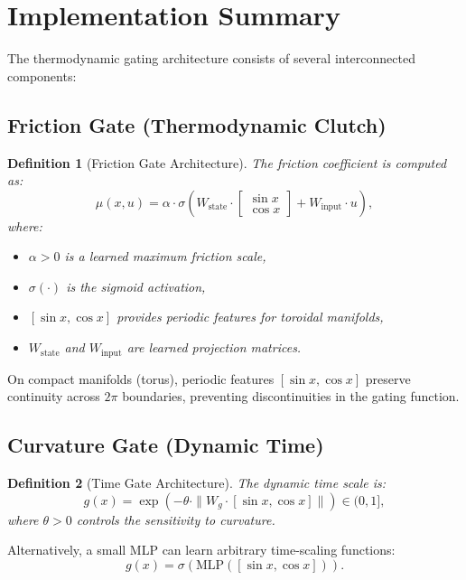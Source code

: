 \documentclass[12pt,letterpaper,twoside]{article}
\newtheorem{definition}{Definition}[section]
\begin{document}
\section{Implementation Summary}

The thermodynamic gating architecture consists of several interconnected components:

\subsection{Friction Gate (Thermodynamic Clutch)}

\begin{definition}[Friction Gate Architecture]
The friction coefficient is computed as:
\[
\mu(x,u) = \alpha \cdot \sigma\left(W_{\text{state}} \cdot \begin{bmatrix}\sin x \\ \cos x\end{bmatrix} + W_{\text{input}} \cdot u\right),
\]
where:
\begin{itemize}
\item $\alpha > 0$ is a learned maximum friction scale,
\item $\sigma(\cdot)$ is the sigmoid activation,
\item $[\sin x, \cos x]$ provides periodic features for toroidal manifolds,
\item $W_{\text{state}}$ and $W_{\text{input}}$ are learned projection matrices.
\end{itemize}
\end{definition}

On compact manifolds (torus), periodic features $[\sin x, \cos x]$ preserve continuity across $2\pi$ boundaries, preventing discontinuities in the gating function.

\subsection{Curvature Gate (Dynamic Time)}

\begin{definition}[Time Gate Architecture]
The dynamic time scale is:
\[
g(x) = \exp\left(-\theta \cdot \|W_g \cdot [\sin x, \cos x]\|\right) \in (0,1],
\]
where $\theta > 0$ controls the sensitivity to curvature.
\end{definition}

Alternatively, a small MLP can learn arbitrary time-scaling functions:
\[
g(x) = \sigma(\text{MLP}([\sin x, \cos x])).
\]
\end{document}

